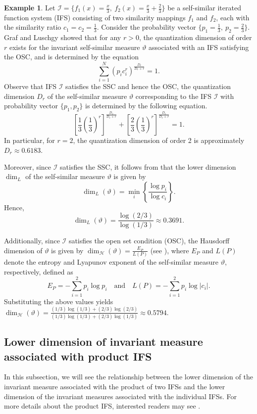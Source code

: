 \documentclass{amsproc}
\theoremstyle{definition}
\newtheorem{example}[theorem]{Example}
\theoremstyle{remark}
\numberwithin{equation}{section}
\begin{document}
\begin{example}
Let \( \mathcal{I} = \{ f_1(x) = \frac{x}{3},\ f_2(x) = \frac{x}{3} + \frac{2}{3} \} \) be a self-similar iterated function system (IFS) consisting of two similarity mappings \( f_1 \) and \( f_2 \), each with the similarity ratio \( c_1 = c_2 = \frac{1}{3} \). Consider the probability vector \( \{ p_1 = \frac{1}{3},\ p_2 = \frac{2}{3} \} \). Graf and Luschgy \cite{GL1} showed that for any \( r > 0 \), the quantization dimension of order \( r \) exists for the invariant self-similar measure $\vartheta$ associated with an IFS satisfying the OSC, and is determined by the equation
\[
\sum_{i=1}^N (p_i c_i^r)^{\frac{D_r}{D_r +r}} =1.
\]
Observe that IFS $\mathcal{I}$ satisfies the SSC and hence the OSC, the quantization dimension $D_r$ of the self-similar measure $\vartheta$ corresponding to the IFS $\mathcal{I}$ with probability vector $\{p_1,p_2\}$ is determined by the following equation.
\[
\left[\frac{1}{3} \left(\frac{1}{3}\right)^r\right]^{\frac{D_r}{D_r + r}} + \left[\frac{2}{3} \left(\frac{1}{3}\right)^r\right]^{\frac{D_r}{D_r + r}} = 1.
\]
In particular, for \( r = 2 \), the quantization dimension of order 2 is approximately \( D_r \approx 0.6183 \).

Moreover, since \( \mathcal{I} \) satisfies the SSC, it follows from \cite[Theorem 7.4.1]{Fraser} that the lower dimension \( \dim_L \) of the self-similar measure \( \vartheta \) is given by
\[
\dim_L(\vartheta) = \min_i \left\{ \frac{\log p_i}{\log c_i} \right\}.
\]
Hence,
\[
\dim_L(\vartheta) = \frac{\log (2/3)}{\log (1/3)} \approx 0.3691.
\]

Additionally, since \( \mathcal{I} \) satisfies the open set condition (OSC), the Hausdorff dimension of \( \vartheta \) is given by $\dim_{\mathcal{H}}(\vartheta) = \frac{E_P}{L(P)}$ (see \cite{H}),
where \( E_P \) and \( L(P) \) denote the entropy and Lyapunov exponent of the self-similar measure \( \vartheta \), respectively, defined as $$E_P = -\sum_{i=1}^2 p_i \log p_i \quad \text{and} \quad L(P) = -\sum_{i=1}^2 p_i \log |c_i|.$$
Substituting the above values yields $\dim_{\mathcal{H}}(\vartheta) = \frac{(1/3)\log (1/3) + (2/3) \log (2/3)}{(1/3) \log (1/3) + (2/3) \log (1/3)} \approx 0.5794.$
\end{example}
\subsection{Lower dimension of invariant measure associated with product IFS} \label{subsec1}
In this subsection, we will see the relationship between the lower dimension of the invariant measure associated with the product of two IFSs and the lower dimension of the invariant measures associated with the individual IFSs. For more details about the product IFS, interested readers may see \cite{VP1}.
\end{document}
